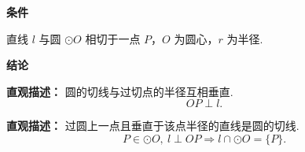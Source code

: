 \begin{statementbox}
	\textbf{\textcolor{CStatement}{条件}}
	\begin{description}[style=nextline, leftmargin=2.8em, labelsep=0.5em, itemsep=0.35em]
		\item[\textbf{\textcolor{CStatement}{条件1（切线与切点）：}}]
			直线 $l$ 与圆 $\odot O$ 相切于一点 $P$，$O$ 为圆心，$r$ 为半径.
	\end{description}
	\textbf{\textcolor{CStatement}{结论}}
	\begin{description}[style=nextline, leftmargin=2.8em, labelsep=0.5em, itemsep=0.45em]
		\item[\textbf{\textcolor{CStatement}{结论一（半径垂直切线）：}}]
			\textbf{\textcolor{CStatement}{直观描述：}}
			圆的切线与过切点的半径互相垂直.
			\[
				OP \perp l.
			\]
		\item[\textbf{\textcolor{CStatement}{推广结论（切线判定定理）：}}]
			\textbf{\textcolor{CStatement}{直观描述：}}
			过圆上一点且垂直于该点半径的直线是圆的切线.
			\[
				P \in \odot O,\ l \perp OP \Longrightarrow l \cap \odot O = \{P\}.
			\]
	\end{description}
\end{statementbox}
